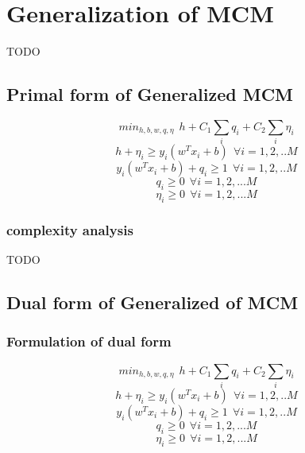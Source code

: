 \chapter{Generalization of MCM}

TODO
\section{Primal form of Generalized MCM }
\begin{equation}\label{mcmeq1}
min_{h,b,w,q,\eta}\:\: h + C_1\sum_i{q_i} + C_2\sum_i{\eta_i}
\end{equation}
\begin{equation}\label{mcmeq2}
h + \eta_i \geq y_i(w^Tx_i+b) \:\:\forall i={1, 2, .. M}
\end{equation}
\begin{equation}\label{mcmeq3}
y_i(w^Tx_i +b) + q_i \geq 1 \:\:\forall i={1,2,.. M}
\end{equation}
\begin{equation}\label{mcmeq4}
q_i \geq 0 \:\:\forall i={1, 2, ... M}
\end{equation}
\begin{equation}
\eta_i \geq 0 \:\:\forall i={1, 2, ... M}
\end{equation}

    

\subsection{complexity analysis}
TODO
\section{Dual form of Generalized of MCM}
\subsection{Formulation of dual form}
\begin{equation}\label{mcmeq1}
min_{h,b,w,q,\eta}\:\: h + C_1\sum_i{q_i} + C_2\sum_i{\eta_i}
\end{equation}
\begin{equation}\label{mcmeq2}
h + \eta_i \geq y_i(w^Tx_i+b) \:\:\forall i={1, 2, .. M}
\end{equation}
\begin{equation}\label{mcmeq3}
y_i(w^Tx_i +b) + q_i \geq 1 \:\:\forall i={1,2,.. M}
\end{equation}
\begin{equation}\label{mcmeq4}
q_i \geq 0 \:\:\forall i={1, 2, ... M}
\end{equation}
\begin{equation}
\eta_i \geq 0 \:\:\forall i={1, 2, ... M}
\end{equation}

